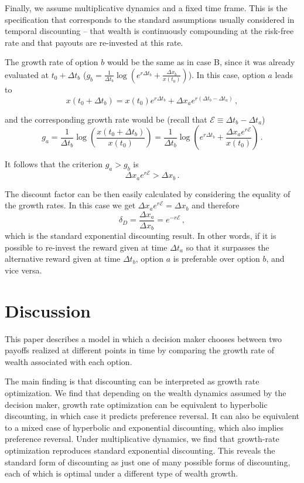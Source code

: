 \documentclass[11pt]{article}
\newcommand{\be}{\begin{equation}}
\newcommand{\ee}{\end{equation}}
\newcommand{\Dt}{\Delta t}
\newcommand{\Dx}{\Delta x}
\newcommand{\Epsilon}{\mathcal{E}}
\numberwithin{equation}{section}
\begin{document}
Finally, we assume multiplicative dynamics and a fixed time frame. This is the specification that corresponds to the standard assumptions usually considered in temporal discounting -- that wealth is continuously compounding at the risk-free rate and that payouts are re-invested at this rate.

The growth rate of option $b$ would be the same as in case B, since it was already evaluated at $t_0+\Dt_b$ ($g_b = \frac{1}{\Dt_b}\log{\left(e^{r \Dt_b} + \frac{\Dx_b}{x\left(t_0\right)}\right)}$). In this case, option $a$ leads to
\be
x\left(t_0+\Dt_b\right) = x\left(t_0\right) e^{r \Dt_b} + \Dx_a e^{r \left(\Dt_b - \Dt_a\right)}\,,
\ee

and the corresponding growth rate would be (recall that $\Epsilon \equiv \Dt_b - \Dt_a$)
\be
g_a = \frac{1}{\Dt_b} \log{\left(\frac{x\left(t_0+\Dt_b\right)}{x\left(t_0\right)}\right)} = \frac{1}{\Dt_b}\log{\left(e^{r \Dt_b} + \frac{\Dx_a e^{r \Epsilon}}{x\left(t_0\right)}\right)}\,.
\ee

It follows that the criterion $g_a > g_b$ is
\be
\Dx_a e^{r \Epsilon} > \Dx_b\,.
\ee

The discount factor can be then easily calculated by considering the equality of the growth rates. In this case we get $\Dx_a e^{r \Epsilon} = \Dx_b$ and therefore
\be
\delta_D = \frac{\Dx_a}{\Dx_b} = e^{-r\Epsilon}\,,
\ee
which is the standard exponential discounting result. In other words, if it is possible to re-invest the reward given at time $\Dt_a$ so that it surpasses the alternative reward given at time $\Dt_b$, option $a$ is preferable over option $b$, and vice versa.

\section{Discussion}\label{sec:discussion}

This paper describes a model in which a decision maker chooses between two payoffs realized at different points in time by comparing the growth rate of wealth associated with each option.

The main finding is that discounting can be interpreted as growth rate optimization. We find that depending on the wealth dynamics assumed by the decision maker, growth rate optimization can be equivalent to hyperbolic discounting, in which case it predicts preference reversal. It can also be equivalent to a mixed case of hyperbolic and exponential discounting, which also implies preference reversal. Under multiplicative dynamics, we find that growth-rate optimization reproduces standard exponential discounting. This reveals the standard form of discounting as just one of many possible forms of discounting, each of which is optimal under a different type of wealth growth.
\end{document}
